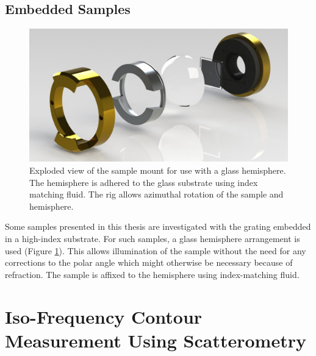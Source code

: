 \subsection{Embedded Samples}
\begin{figure}
\centering \includegraphics[width=\linewidth]{hemispherical-prism.jpg}
\caption[Exploded view of the sample mount for use with a glass hemisphere.]{Exploded view of the sample mount for use with a glass hemisphere. The hemisphere is adhered to the glass substrate using index matching fluid. The rig allows azimuthal rotation of the sample and hemisphere.\label{fig:hemispherical-prism}}
\end{figure}
Some samples presented in this thesis are investigated with the grating embedded in a high-index substrate. For such samples, a glass hemisphere arrangement is used (Figure \ref{fig:hemispherical-prism}). This allows illumination of the sample without the need for any corrections to the polar angle which might otherwise be necessary because of refraction. The sample is affixed to the hemisphere using index-matching fluid.

\section{Iso-Frequency Contour Measurement Using Scatterometry \label{sec:expscatterometry}}

